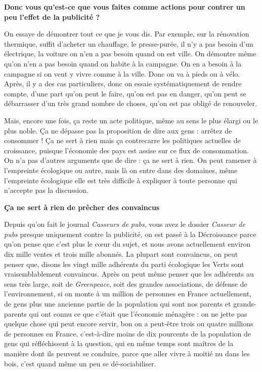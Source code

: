 \begin{small}
\textbf{Donc vous qu'est-ce que vous faites comme actions pour contrer un peu l'effet de la publicité ?}

\vspace{1\baselineskip}

On essaye de démontrer tout ce que je vous dis. Par exemple, sur la rénovation thermique, suffit d'acheter un chauffage, le presse-purée, il n'y a pas besoin d'un électrique, la voiture on n'en a pas besoin quand on est ville. On démontre même qu’on n’en a pas besoin quand on habite à la campagne.  On en a besoin à la campagne si on veut y vivre comme à la ville. Donc on va à pieds ou à vélo. Après, il y a des cas particuliers, donc on essaie systématiquement de rendre compte, d'une part qu'on peut le faire, qu'on est pas en danger, qu'on peut se débarrasser d'un très grand nombre de choses, qu'on est pas obligé de renouveler. 

Mais, encore une fois, ça reste un acte politique, même au sens le plus élargi ou le plus noble. Ça ne dépasse pas la proposition de dire aux gens : arrêtez de consommer ! Ça ne sert à rien mais ça contrecarre les politiques actuelles de croissance, puisque l'économie des pays est assise sur ce flux de consommation. On n’a pas d'autres arguments que de dire : ça ne sert à rien. On peut ramener à l'empreinte écologique ou autre, mais là on entre dans des domaines, même l'empreinte écologique elle est très difficile à expliquer à toute personne qui n'accepte pas la discussion.

\vspace{1\baselineskip}

\textbf{Ça ne sert à rien de prêcher des convaincus}

\vspace{1\baselineskip}

Depuis qu'on fait le journal \textit{Casseurs de pubs}, vous avez le dossier \textit{Casseur de pubs} presque uniquement contre la publicité, on est passé à la Décroissance parce qu'on pense que c'est plus le cœur du sujet, et nous avons actuellement environ dix mille ventes et trois mille abonnés. La plupart sont convaincus, on peut penser que, disons les vingt mille adhérents du parti écologique les Verts sont vraisemblablement convaincus. Après on peut même penser que les adhérents au sens très large, soit de \textit{Greenpeace}, soit des grandes associations, de défense de l'environnement, si on monte à un million de personnes en France actuellement, de gens plus une ancienne partie de la population qui sont nos parents et grands-parents qui ont connu ce que c'était que l'économie ménagère : on ne jette pas quelque chose qui peut encore servir, bon on a peut-être trois ou quatre millions de personnes en France, c'est-à-dire moins de dix pourcents de la population de gens qui réfléchissent à la question, qui en même temps sont maîtres de la manière dont ils peuvent se conduire, parce que aller vivre à moitié nu dans les bois, c'est quand même un peu se dé-sociabiliser. 


\end{small}
